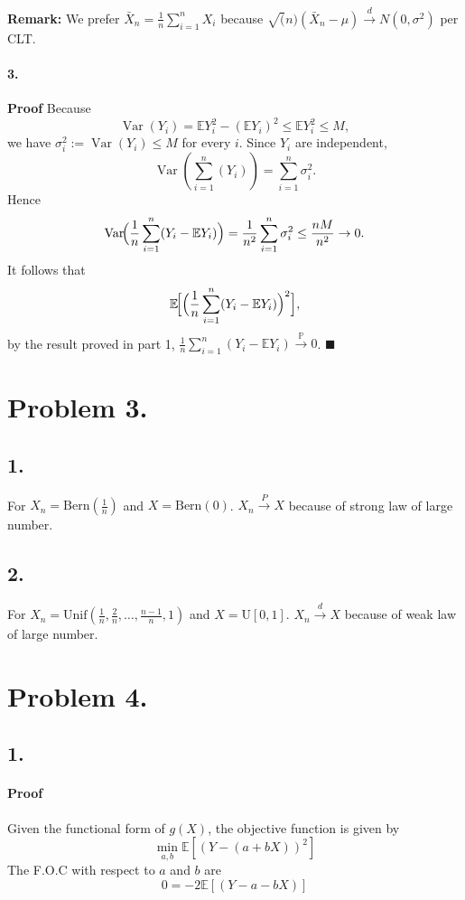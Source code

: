 \documentclass[11pt]{article}
\theoremstyle{definition}
\theoremstyle{boldtitle} %
\numberwithin{equation}{section}
\numberwithin{figure}{section}
\numberwithin{table}{section}
\begin{document}
\textbf{Remark:} We prefer $\bar{X}_n = \frac{1}{n} \sum_{i=1}^n X_i$ because 
$\sqrt(n) (\bar{X}_n - \mu) \xrightarrow{d} N(0, \sigma^2)$ per CLT.


\paragraph*{3.}
\textbf{Proof}
Because
\[
\operatorname{Var}(Y_i)=\mathbb E Y_i^{2}-(\mathbb EY_i)^{2}\le\mathbb E Y_i^{2}\le M,
\]
we have $\sigma_i^{2}:=\operatorname{Var}(Y_i)\le M$ for every $i$.
Since $Y_i$ are independent,
\[
\operatorname{Var}\left(\sum_{i=1}^{n}(Y_i)\right)
      =\sum_{i=1}^{n}\sigma_i^{2}.
\]
Hence
\[
\operatorname{Var}\!\Bigl(\frac1n\sum_{i=1}^{n}(Y_i-\mathbb EY_i)\Bigr)
      =\frac1{n^{2}}\sum_{i=1}^{n}\sigma_i^{2}
      \le\frac{nM}{n^{2}}
      \rightarrow 0.
\]
It follows that
\[
\mathbb E\!\Bigl[\Bigl(\frac1n\sum_{i=1}^{n}(Y_i-\mathbb EY_i)\Bigr)^{2}\Bigr],
\]
by the result proved in part 1,  
$\frac1n\sum_{i=1}^{n}(Y_i-\mathbb EY_i)\xrightarrow{\mathbb P}0$.
\(\blacksquare\)


\section*{Problem 3.}
\subsection*{1.} For $X_n = \text{Bern}(\frac{1}{n})$ and $X = \text{Bern}(0)$.
$X_n \xrightarrow{P} X$ because of strong law of large number.

\subsection*{2.} For $X_n = \text{Unif}(\frac{1}{n}, \frac{2}{n}, \ldots, \frac{n-1}{n}, 1)$ and $X = \text{U}[0,1]$.
$X_n \xrightarrow{d} X$ because of weak law of large number.


\section*{Problem 4.}
\subsection*{1.}
\paragraph{Proof}
Given the functional form of $g(X)$, the objective function is given by 
\[
\min_{a, b} \mathbb{E}\left[(Y - (a + b X))^2\right]
\]
The F.O.C with respect to $a$ and $b$ are  
\[
0 = - 2 \mathbb{E}\left[(Y -a - bX)\right]
\]
\end{document}
